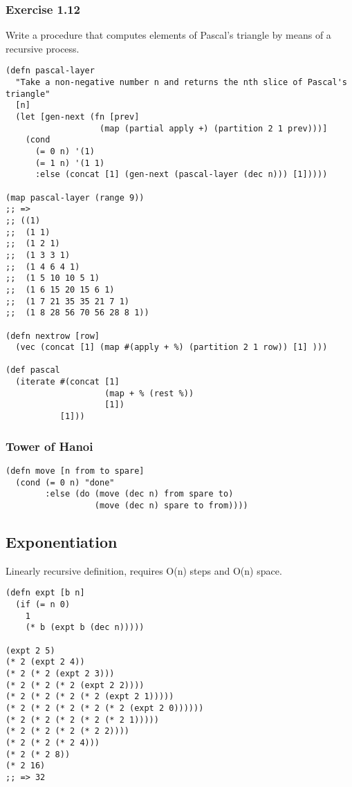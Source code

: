 \documentclass[11pt]{article}
\begin{document}
\subsubsection{Exercise 1.12}
\label{sec-2-3-3}
Write a procedure that computes elements of Pascal's triangle by means of a recursive process.

\begin{verbatim}
(defn pascal-layer
  "Take a non-negative number n and returns the nth slice of Pascal's triangle"
  [n]
  (let [gen-next (fn [prev]
                   (map (partial apply +) (partition 2 1 prev)))]
    (cond
      (= 0 n) '(1)
      (= 1 n) '(1 1)
      :else (concat [1] (gen-next (pascal-layer (dec n))) [1]))))

(map pascal-layer (range 9))
;; =>
;; ((1)
;;  (1 1)
;;  (1 2 1)
;;  (1 3 3 1)
;;  (1 4 6 4 1)
;;  (1 5 10 10 5 1)
;;  (1 6 15 20 15 6 1)
;;  (1 7 21 35 35 21 7 1)
;;  (1 8 28 56 70 56 28 8 1))

(defn nextrow [row]
  (vec (concat [1] (map #(apply + %) (partition 2 1 row)) [1] )))

(def pascal
  (iterate #(concat [1]
                    (map + % (rest %))
                    [1])
           [1]))
\end{verbatim}

\subsubsection{Tower of Hanoi}
\label{sec-2-3-4}
\begin{verbatim}
(defn move [n from to spare]
  (cond (= 0 n) "done"
        :else (do (move (dec n) from spare to)
                  (move (dec n) spare to from))))
\end{verbatim}

\subsection{Exponentiation}
\label{sec-2-4}
Linearly recursive definition, requires O(n) steps and O(n) space.

\begin{verbatim}
(defn expt [b n]
  (if (= n 0)
    1
    (* b (expt b (dec n)))))

(expt 2 5)
(* 2 (expt 2 4))
(* 2 (* 2 (expt 2 3)))
(* 2 (* 2 (* 2 (expt 2 2))))
(* 2 (* 2 (* 2 (* 2 (expt 2 1)))))
(* 2 (* 2 (* 2 (* 2 (* 2 (expt 2 0))))))
(* 2 (* 2 (* 2 (* 2 (* 2 1)))))
(* 2 (* 2 (* 2 (* 2 2))))
(* 2 (* 2 (* 2 4)))
(* 2 (* 2 8))
(* 2 16)
;; => 32
\end{verbatim}
\end{document}
